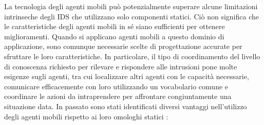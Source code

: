 La tecnologia degli agenti mobili può potenzialmente superare alcune limitazioni intrinseche degli IDS  che utilizzano solo componenti statici. Ciò non significa che le caratteristiche degli agenti mobili in sé siano sufficienti per ottenere miglioramenti. Quando si applicano agenti mobili a questo dominio di applicazione, sono comunque necessarie scelte di progettazione accurate per sfruttare le loro caratteristiche. In particolare, il tipo di coordinamento del livello di conoscenza richiesto per rilevare e rispondere alle intrusioni pone molte esigenze sugli agenti, tra cui localizzare altri agenti con le capacità necessarie, comunicare efficacemente con loro utilizzando un vocabolario comune e coordinare le azioni da intraprendere per affrontare congiuntamente una situazione data. In passato sono stati identificati diversi vantaggi nell'utilizzo degli agenti mobili rispetto ai loro omologhi statici \cite{lange1998mobile,smith1988survey,vuong2011advanced}:

